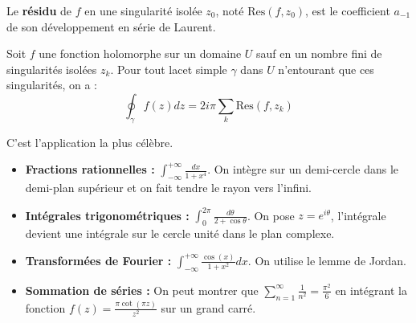\begin{definition}[Résidu]
    Le \textbf{résidu} de $f$ en une singularité isolée $z_0$, noté $\mathrm{Res}(f, z_0)$, est le coefficient $a_{-1}$ de son développement en série de Laurent.
\end{definition}

\begin{theorem}
    Soit $f$ une fonction holomorphe sur un domaine $U$ sauf en un nombre fini de singularités isolées $z_k$. Pour tout lacet simple $\gamma$ dans $U$ n'entourant que ces singularités, on a :
    $$ \oint_\gamma f(z) dz = 2i\pi \sum_k \mathrm{Res}(f, z_k) $$
\end{theorem}

\begin{application}
    C'est l'application la plus célèbre.
    \begin{itemize}
        \item \textbf{Fractions rationnelles :} $\int_{-\infty}^{+\infty} \frac{dx}{1+x^4}$. On intègre sur un demi-cercle dans le demi-plan supérieur et on fait tendre le rayon vers l'infini.
        \item \textbf{Intégrales trigonométriques :} $\int_0^{2\pi} \frac{d\theta}{2+\cos\theta}$. On pose $z=e^{i\theta}$, l'intégrale devient une intégrale sur le cercle unité dans le plan complexe.
        \item \textbf{Transformées de Fourier :} $\int_{-\infty}^{+\infty} \frac{\cos(x)}{1+x^2} dx$. On utilise le lemme de Jordan.
        \item \textbf{Sommation de séries :} On peut montrer que $\sum_{n=1}^\infty \frac{1}{n^2} = \frac{\pi^2}{6}$ en intégrant la fonction $f(z) = \frac{\pi \cot(\pi z)}{z^2}$ sur un grand carré.
    \end{itemize}
\end{application}